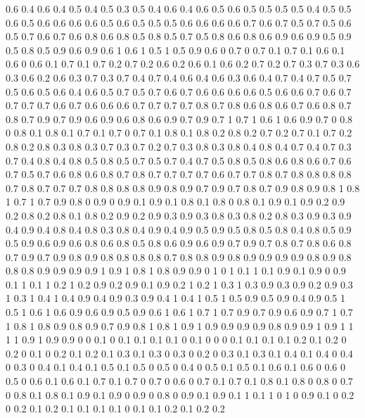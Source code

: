 0.6 0.4
0.6 0.4
0.5 0.4
0.5 0.3
0.5 0.4
0.6 0.4
0.6 0.5
0.6 0.5
0.5 0.5
0.5 0.4
0.5 0.5
0.6 0.5
0.6 0.6
0.6 0.6
0.5 0.6
0.5 0.5
0.5 0.6
0.6 0.6
0.6 0.7
0.6 0.7
0.5 0.7
0.5 0.6
0.5 0.7
0.6 0.7
0.6 0.8
0.6 0.8
0.5 0.8
0.5 0.7
0.5 0.8
0.6 0.8
0.6 0.9
0.6 0.9
0.5 0.9
0.5 0.8
0.5 0.9
0.6 0.9
0.6 1
0.6 1
0.5 1
0.5 0.9
0.6 0
0.7 0
0.7 0.1
0.7 0.1
0.6 0.1
0.6 0
0.6 0.1
0.7 0.1
0.7 0.2
0.7 0.2
0.6 0.2
0.6 0.1
0.6 0.2
0.7 0.2
0.7 0.3
0.7 0.3
0.6 0.3
0.6 0.2
0.6 0.3
0.7 0.3
0.7 0.4
0.7 0.4
0.6 0.4
0.6 0.3
0.6 0.4
0.7 0.4
0.7 0.5
0.7 0.5
0.6 0.5
0.6 0.4
0.6 0.5
0.7 0.5
0.7 0.6
0.7 0.6
0.6 0.6
0.6 0.5
0.6 0.6
0.7 0.6
0.7 0.7
0.7 0.7
0.6 0.7
0.6 0.6
0.6 0.7
0.7 0.7
0.7 0.8
0.7 0.8
0.6 0.8
0.6 0.7
0.6 0.8
0.7 0.8
0.7 0.9
0.7 0.9
0.6 0.9
0.6 0.8
0.6 0.9
0.7 0.9
0.7 1
0.7 1
0.6 1
0.6 0.9
0.7 0
0.8 0
0.8 0.1
0.8 0.1
0.7 0.1
0.7 0
0.7 0.1
0.8 0.1
0.8 0.2
0.8 0.2
0.7 0.2
0.7 0.1
0.7 0.2
0.8 0.2
0.8 0.3
0.8 0.3
0.7 0.3
0.7 0.2
0.7 0.3
0.8 0.3
0.8 0.4
0.8 0.4
0.7 0.4
0.7 0.3
0.7 0.4
0.8 0.4
0.8 0.5
0.8 0.5
0.7 0.5
0.7 0.4
0.7 0.5
0.8 0.5
0.8 0.6
0.8 0.6
0.7 0.6
0.7 0.5
0.7 0.6
0.8 0.6
0.8 0.7
0.8 0.7
0.7 0.7
0.7 0.6
0.7 0.7
0.8 0.7
0.8 0.8
0.8 0.8
0.7 0.8
0.7 0.7
0.7 0.8
0.8 0.8
0.8 0.9
0.8 0.9
0.7 0.9
0.7 0.8
0.7 0.9
0.8 0.9
0.8 1
0.8 1
0.7 1
0.7 0.9
0.8 0
0.9 0
0.9 0.1
0.9 0.1
0.8 0.1
0.8 0
0.8 0.1
0.9 0.1
0.9 0.2
0.9 0.2
0.8 0.2
0.8 0.1
0.8 0.2
0.9 0.2
0.9 0.3
0.9 0.3
0.8 0.3
0.8 0.2
0.8 0.3
0.9 0.3
0.9 0.4
0.9 0.4
0.8 0.4
0.8 0.3
0.8 0.4
0.9 0.4
0.9 0.5
0.9 0.5
0.8 0.5
0.8 0.4
0.8 0.5
0.9 0.5
0.9 0.6
0.9 0.6
0.8 0.6
0.8 0.5
0.8 0.6
0.9 0.6
0.9 0.7
0.9 0.7
0.8 0.7
0.8 0.6
0.8 0.7
0.9 0.7
0.9 0.8
0.9 0.8
0.8 0.8
0.8 0.7
0.8 0.8
0.9 0.8
0.9 0.9
0.9 0.9
0.8 0.9
0.8 0.8
0.8 0.9
0.9 0.9
0.9 1
0.9 1
0.8 1
0.8 0.9
0.9 0
1 0
1 0.1
1 0.1
0.9 0.1
0.9 0
0.9 0.1
1 0.1
1 0.2
1 0.2
0.9 0.2
0.9 0.1
0.9 0.2
1 0.2
1 0.3
1 0.3
0.9 0.3
0.9 0.2
0.9 0.3
1 0.3
1 0.4
1 0.4
0.9 0.4
0.9 0.3
0.9 0.4
1 0.4
1 0.5
1 0.5
0.9 0.5
0.9 0.4
0.9 0.5
1 0.5
1 0.6
1 0.6
0.9 0.6
0.9 0.5
0.9 0.6
1 0.6
1 0.7
1 0.7
0.9 0.7
0.9 0.6
0.9 0.7
1 0.7
1 0.8
1 0.8
0.9 0.8
0.9 0.7
0.9 0.8
1 0.8
1 0.9
1 0.9
0.9 0.9
0.9 0.8
0.9 0.9
1 0.9
1 1
1 1
0.9 1
0.9 0.9
0 0
0.1 0
0.1 0.1
0.1 0.1
0 0.1
0 0
0 0.1
0.1 0.1
0.1 0.2
0.1 0.2
0 0.2
0 0.1
0 0.2
0.1 0.2
0.1 0.3
0.1 0.3
0 0.3
0 0.2
0 0.3
0.1 0.3
0.1 0.4
0.1 0.4
0 0.4
0 0.3
0 0.4
0.1 0.4
0.1 0.5
0.1 0.5
0 0.5
0 0.4
0 0.5
0.1 0.5
0.1 0.6
0.1 0.6
0 0.6
0 0.5
0 0.6
0.1 0.6
0.1 0.7
0.1 0.7
0 0.7
0 0.6
0 0.7
0.1 0.7
0.1 0.8
0.1 0.8
0 0.8
0 0.7
0 0.8
0.1 0.8
0.1 0.9
0.1 0.9
0 0.9
0 0.8
0 0.9
0.1 0.9
0.1 1
0.1 1
0 1
0 0.9
0.1 0
0.2 0
0.2 0.1
0.2 0.1
0.1 0.1
0.1 0
0.1 0.1
0.2 0.1
0.2 0.2
